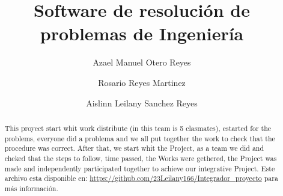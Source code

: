 \documentclass{IEEEcsmag}
\begin{document}

\title{Software de resolución de problemas de Ingeniería }

\author {Azael Manuel Otero Reyes }

\author{Rosario Reyes Martinez }

\author{ Aislinn Leilany Sanchez Reyes }




\begin{abstract}
This proyect start whit work distribute (in this team is 5 clasmates), estarted for the 
problems, everyone did a problema and we all put together the work to check that the 
procedure was correct.
After that, we start whit the Project, as a team we did and cheked that the steps to follow, 
time passed, the Works were gethered, the Project was made and independently 
participated together to achieve our integrative Project.
Este archivo esta disponible en:
\url{https://github.com/23Leilany166/Integrador_proyecto} para más información.
\end{abstract}
\maketitle
\end{document}
